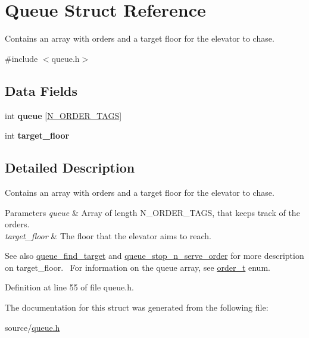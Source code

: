 \hypertarget{structQueue}{}\section{Queue Struct Reference}
\label{structQueue}


Contains an array with orders and a target floor for the elevator to chase.  




{\ttfamily \#include $<$queue.\+h$>$}

\subsection*{Data Fields}
\begin{DoxyCompactItemize}
\item 
\mbox{\label{structQueue_a5009d22561b0a1f0b94883331e98337f}} 
int {\bfseries queue} \mbox{[}\mbox{\hyperlink{queue_8h_a6c7dd10fb53eaa1cb9705e4ee36f5fcba468de5038698a54ae672a7879f92bc05}{N\+\_\+\+O\+R\+D\+E\+R\+\_\+\+T\+A\+GS}}\mbox{]}
\item 
\mbox{\label{structQueue_a95698e7080ed2265155b7bad70e7cdd7}} 
int {\bfseries target\+\_\+floor}
\end{DoxyCompactItemize}


\subsection{Detailed Description}
Contains an array with orders and a target floor for the elevator to chase. 


\begin{DoxyParams}{Parameters}
{\em queue} & Array of length N\+\_\+\+O\+R\+D\+E\+R\+\_\+\+T\+A\+GS, that keeps track of the orders. \\
\hline
{\em target\+\_\+floor} & The floor that the elevator aims to reach.\\
\hline
\end{DoxyParams}
\begin{DoxySeeAlso}{See also}
\mbox{\hyperlink{queue_8h_ae1f1f6105b668e5722bd779a25a2439d}{queue\+\_\+find\+\_\+target}} and \mbox{\hyperlink{queue_8h_a6246a25fc3b07b678c031c3dd798e077}{queue\+\_\+stop\+\_\+n\+\_\+serve\+\_\+order}} for more description on {\ttfamily target\+\_\+floor}.~\newline
For information on the {\ttfamily queue} array, see \mbox{\hyperlink{queue_8h_a6c7dd10fb53eaa1cb9705e4ee36f5fcb}{order\+\_\+t}} enum. 
\end{DoxySeeAlso}


Definition at line 55 of file queue.\+h.



The documentation for this struct was generated from the following file\+:\begin{DoxyCompactItemize}
\item 
source/\mbox{\hyperlink{queue_8h}{queue.\+h}}\end{DoxyCompactItemize}
